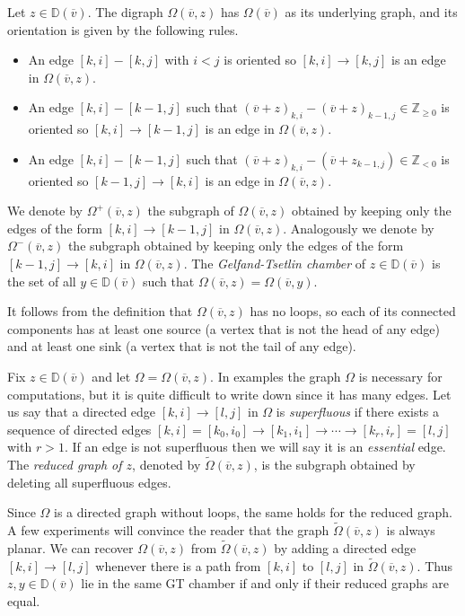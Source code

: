 \documentclass[11pt,fleqn]{amsart}
\newcommand\ZZ{\mathbb Z}
\newcommand\vv{\overline{v}}
\newcommand\DD{\mathbb D}
\begin{document}
\begin{Definition}
\label{D:gt-chamber}
Let $z \in \DD(\vv)$. The digraph $\Omega(\vv,z)$ has $\Omega(\vv)$ as its 
underlying graph, and its orientation is given by the following rules.
\begin{itemize}
\item An edge $[k,i] - [k,j]$ with $i < j$ is oriented so $[k,i] \rightarrow 
[k,j]$ is an edge in $\Omega(\vv, z)$.

\item An edge $[k,i] - [k-1,j]$ such that $(\vv+z)_{k,i} - (\vv+z)_{k-1,j}
\in \ZZ_{\geq 0}$ is oriented so $[k,i] \rightarrow [k-1,j]$ is an edge in 
$\Omega(\vv, z)$.

\item An edge $[k,i] - [k-1,j]$ such that $(\vv + z)_{k,i} - (\vv + z_{k-1,j})
\in \ZZ_{<0}$ is oriented so $[k-1,j] \rightarrow [k,i]$ is an edge in 
$\Omega(\vv, z)$.
\end{itemize}
We denote by $\Omega^+(\vv, z)$ the subgraph of $\Omega(\vv,z)$ obtained by 
keeping only the edges of the form $[k,i] \rightarrow [k-1,j]$ in 
$\Omega(\vv, z)$. Analogously we denote by $\Omega^-(\vv, z)$ the subgraph 
obtained by keeping only the edges of the form $[k-1,j] \rightarrow [k,i]$ in 
$\Omega(\vv, z)$. The \emph{Gelfand-Tsetlin chamber} of $z \in \DD(\vv)$ is 
the set of all $y \in \DD(\vv)$ such that $\Omega(\vv,z) = \Omega(\vv,y)$. 
\end{Definition}
It follows from the definition that $\Omega(\vv,z)$ has no loops, so each of 
its connected components has at least one source (a vertex that is not the 
head of any edge) and at least one sink (a vertex that is not the tail of any 
edge).

Fix $z \in \DD(\vv)$ and let $\Omega = \Omega(\vv,z)$. In examples the graph 
$\Omega$ is necessary for computations, but it is quite difficult to write 
down since it has many edges. Let us say that a directed edge $[k,i] 
\rightarrow [l,j]$ in $\Omega$ is \emph{superfluous} if there exists a 
sequence of directed edges $[k,i] = [k_0, i_0] \rightarrow [k_1, i_1] 
\rightarrow \cdots \rightarrow [k_r, i_r] = [l,j]$ with $r > 1$. If an edge is 
not superfluous then we will say it is an \emph{essential} edge. The 
\emph{reduced graph of $z$}, denoted by $\widetilde\Omega(\vv,z)$, is the 
subgraph obtained by deleting all superfluous edges. 

Since $\Omega$ is a directed graph without loops, the same holds for the 
reduced graph. A few experiments will convince the reader that the graph 
$\widetilde\Omega(\vv,z)$ is always planar. We can recover $\Omega(\vv,z)$ 
from $\widetilde\Omega(\vv,z)$ by adding a directed edge $[k,i] \rightarrow 
[l,j]$ whenever there is a path from $[k,i]$ to $[l,j]$ in 
$\widetilde\Omega(\vv,z)$. Thus $z,y \in \DD(\vv)$ lie in the same GT chamber 
if and only if their reduced graphs are equal. 
\end{document}
